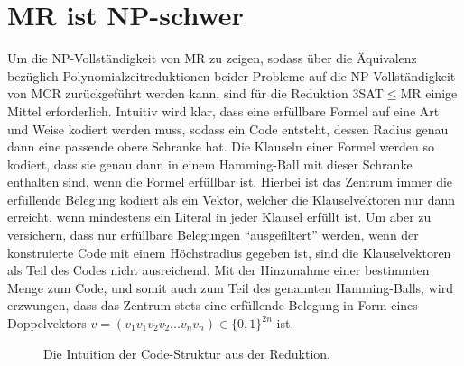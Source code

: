 \documentclass[11pt]{article}
\theoremstyle{break}
\theoremstyle{norm}
\begin{document}
\section{MR ist NP-schwer}\label{absch4}
Um die NP-Vollständigkeit von MR zu zeigen, sodass über die Äquivalenz bezüglich Polynomialzeitreduktionen beider Probleme auf die NP-Vollständigkeit von MCR zu\-rück\-ge\-führt werden kann, sind für die Reduktion 3SAT$\leq$MR einige Mittel erforderlich. Intuitiv wird klar, dass eine erfüllbare Formel auf eine Art und Weise kodiert werden muss, sodass ein Code entsteht, dessen Radius genau dann eine passende obere Schranke hat. Die Klauseln einer Formel werden so kodiert, dass sie genau dann in einem Hamming-Ball mit dieser Schranke enthalten sind, wenn die Formel erfüllbar ist. Hierbei ist das Zentrum immer die erfüllende Belegung kodiert als ein Vektor, welcher die Klau\-sel\-vek\-toren nur dann erreicht, wenn mindestens ein Literal in jeder Klausel erfüllt ist. Um aber zu versichern, dass nur erfüllbare Belegungen ``ausgefiltert'' werden, wenn der konstruierte Code mit einem Höchstradius gegeben ist, sind die Klauselvektoren als Teil des Codes nicht ausreichend. Mit der Hinzunahme einer bestimmten Menge zum Code, und somit auch zum Teil des genannten Hamming-Balls, wird erzwungen, dass das Zentrum stets eine erfüllende Belegung in Form eines Doppelvektors $v = (v_1v_1v_2v_2...v_nv_n) \in \{0,1\}^{2n}$ ist.
\begin{figure}[H]
    \centering
    \caption{Die Intuition der Code-Struktur aus der Reduktion.}
    \label{fig:enter-label}
\end{figure}
\end{document}
